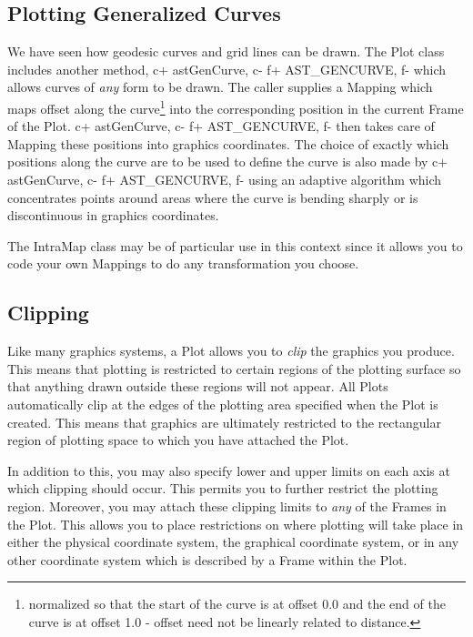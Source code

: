 \documentclass[twoside,11pt]{article}
\begin{document}
\subsection{\label{ss:plottinggeneralizedcurves}Plotting Generalized Curves}
We have seen how geodesic curves and grid lines can be drawn. The Plot
class includes another method,
c+
astGenCurve,
c-
f+
AST\_GENCURVE,
f-
which allows curves of {\em any} form to be drawn. The caller supplies a
Mapping which maps offset along the curve\footnote{normalized so that the
start of the curve is at offset 0.0 and the end of the curve is at offset
1.0 - offset need not be linearly related to distance.} into the
corresponding position in the current Frame of the Plot.
c+
astGenCurve,
c-
f+
AST\_GENCURVE,
f-
then takes care of Mapping these positions into graphics coordinates. The
choice of exactly which positions along the curve are to be used to
define the curve is also made by
c+
astGenCurve,
c-
f+
AST\_GENCURVE,
f-
using an adaptive algorithm which concentrates points around areas where
the curve is bending sharply or is discontinuous in graphics coordinates.

The IntraMap class may be of particular use in this context since it allows
you to code your own Mappings to do any transformation you choose.


\subsection{\label{ss:clipping}Clipping}

Like many graphics systems, a Plot allows you to {\em{clip}} the graphics
you produce. This means that plotting is restricted to certain regions
of the plotting surface so that anything drawn outside these regions
will not appear.  All Plots automatically clip at the edges of the
plotting area specified when the Plot is created. This means that
graphics are ultimately restricted to the rectangular region of
plotting space to which you have attached the Plot.

In addition to this, you may also specify lower and upper limits on
each axis at which clipping should occur. This permits you to further
restrict the plotting region. Moreover, you may attach these clipping
limits to {\em{any}} of the Frames in the Plot. This allows you to
place restrictions on where plotting will take place in either the
physical coordinate system, the graphical coordinate system, or in any
other coordinate system which is described by a Frame within the Plot.
\end{document}
